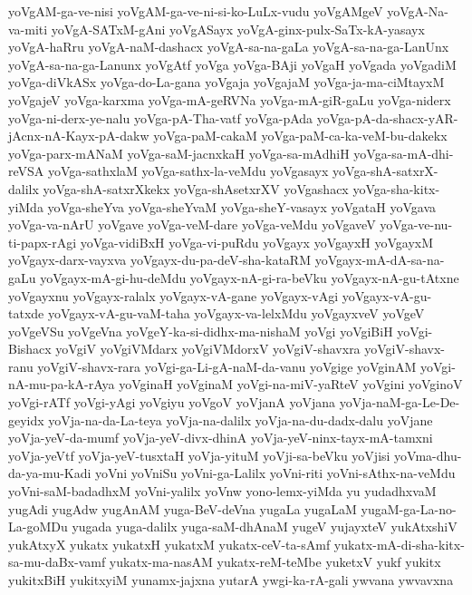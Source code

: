 {yoVgAM-ga-ve-nisi
yoVgAM-ga-ve-ni-si-ko-LuLx-vudu
yoVgAMgeV
yoVgA-Na-va-miti
yoVgA-SATxM-gAni
yoVgASayx
yoVgA-ginx-pulx-SaTx-kA-yasayx
yoVgA-haRru
yoVgA-naM-dashacx
yoVgA-sa-na-gaLa
yoVgA-sa-na-ga-LanUnx
yoVgA-sa-na-ga-Lanunx
yoVgAtf
yoVga
yoVga-BAji
yoVgaH
yoVgada
yoVgadiM
yoVga-diVkASx
yoVga-do-La-gana
yoVgaja
yoVgajaM
yoVga-ja-ma-ciMtayxM
yoVgajeV
yoVga-karxma
yoVga-mA-geRVNa
yoVga-mA-giR-gaLu
yoVga-niderx
yoVga-ni-derx-ye-nalu
yoVga-pA-Tha-vatf
yoVga-pAda
yoVga-pA-da-shacx-yAR-jAcnx-nA-Kayx-pA-dakw
yoVga-paM-cakaM
yoVga-paM-ca-ka-veM-bu-dakekx
yoVga-parx-mANaM
yoVga-saM-jacnxkaH
yoVga-sa-mAdhiH
yoVga-sa-mA-dhi-reVSA
yoVga-sathxlaM
yoVga-sathx-la-veMdu
yoVgasayx
yoVga-shA-satxrX-dalilx
yoVga-shA-satxrXkekx
yoVga-shAsetxrXV
yoVgashacx
yoVga-sha-kitx-yiMda
yoVga-sheYva
yoVga-sheYvaM
yoVga-sheY-vasayx
yoVgataH
yoVgava
yoVga-va-nArU
yoVgave
yoVga-veM-dare
yoVga-veMdu
yoVgaveV
yoVga-ve-nu-ti-papx-rAgi
yoVga-vidiBxH
yoVga-vi-puRdu
yoVgayx
yoVgayxH
yoVgayxM
yoVgayx-darx-vayxva
yoVgayx-du-pa-deV-sha-kataRM
yoVgayx-mA-dA-sa-na-gaLu
yoVgayx-mA-gi-hu-deMdu
yoVgayx-nA-gi-ra-beVku
yoVgayx-nA-gu-tAtxne
yoVgayxnu
yoVgayx-ralalx
yoVgayx-vA-gane
yoVgayx-vAgi
yoVgayx-vA-gu-tatxde
yoVgayx-vA-gu-vaM-taha
yoVgayx-va-lelxMdu
yoVgayxveV
yoVgeV
yoVgeVSu
yoVgeVna
yoVgeY-ka-si-didhx-ma-nishaM
yoVgi
yoVgiBiH
yoVgi-Bishacx
yoVgiV
yoVgiVMdarx
yoVgiVMdorxV
yoVgiV-shavxra
yoVgiV-shavx-ranu
yoVgiV-shavx-rara
yoVgi-ga-Li-gA-naM-da-vanu
yoVgige
yoVginAM
yoVgi-nA-mu-pa-kA-rAya
yoVginaH
yoVginaM
yoVgi-na-miV-yaRteV
yoVgini
yoVginoV
yoVgi-rATf
yoVgi-yAgi
yoVgiyu
yoVgoV
yoVjanA
yoVjana
yoVja-naM-ga-Le-De-geyidx
yoVja-na-da-La-teya
yoVja-na-dalilx
yoVja-na-du-dadx-dalu
yoVjane
yoVja-yeV-da-mumf
yoVja-yeV-divx-dhinA
yoVja-yeV-ninx-tayx-mA-tamxni
yoVja-yeVtf
yoVja-yeV-tusxtaH
yoVja-yituM
yoVji-sa-beVku
yoVjisi
yoVma-dhu-da-ya-mu-Kadi
yoVni
yoVniSu
yoVni-ga-Lalilx
yoVni-riti
yoVni-sAthx-na-veMdu
yoVni-saM-badadhxM
yoVni-yalilx
yoVnw
yono-lemx-yiMda
yu
yudadhxvaM
yugAdi
yugAdw
yugAnAM
yuga-BeV-deVna
yugaLa
yugaLaM
yugaM-ga-La-no-La-goMDu
yugada
yuga-dalilx
yuga-saM-dhAnaM
yugeV
yujayxteV
yukAtxshiV
yukAtxyX
yukatx
yukatxH
yukatxM
yukatx-ceV-ta-sAmf
yukatx-mA-di-sha-kitx-sa-mu-daBx-vamf
yukatx-ma-nasAM
yukatx-reM-teMbe
yuketxV
yukf
yukitx
yukitxBiH
yukitxyiM
yunamx-jajxna
yutarA
ywgi-ka-rA-gali
ywvana
ywvavxna
}
